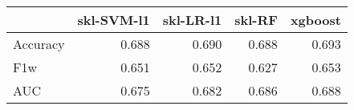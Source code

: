 \begin{tabular}{lrrrr}
\toprule
{} &  skl-SVM-l1 &  skl-LR-l1 &  skl-RF &  xgboost \\
\midrule
Accuracy &       0.688 &      0.690 &   0.688 &    0.693 \\
F1w      &       0.651 &      0.652 &   0.627 &    0.653 \\
AUC      &       0.675 &      0.682 &   0.686 &    0.688 \\
\bottomrule
\end{tabular}
